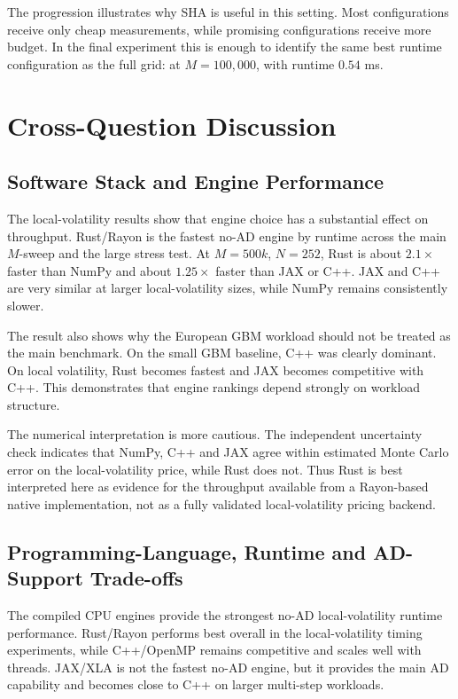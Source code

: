 The progression illustrates why SHA is useful in this setting. Most
configurations receive only cheap measurements, while promising configurations
receive more budget. In the final experiment this is enough to identify the
same best runtime configuration as the full grid:
 at \(M=100{,}000\), with runtime \(0.54\) ms.

\section{Cross-Question Discussion}
\label{sec:results-discussion}

\subsection{Software Stack and Engine Performance}
\label{subsec:discussion-software-stack}

The local-volatility results show that engine choice has a substantial effect
on throughput.  Rust/Rayon is the fastest no-AD engine by runtime across the main
\(M\)-sweep and the large stress test.  At \(M=500k\), \(N=252\), Rust is
about \(2.1\times\) faster than NumPy and about \(1.25\times\) faster than
JAX or C++.  JAX and C++ are very similar at larger local-volatility sizes,
while NumPy remains consistently slower.

The result also shows why the European GBM workload should not be treated as
the main benchmark.  On the small GBM baseline, C++ was clearly dominant.
On local volatility, Rust becomes fastest and JAX becomes competitive with
C++.  This demonstrates that engine rankings depend strongly on workload
structure.

The numerical interpretation is more cautious. The independent uncertainty
check indicates that NumPy, C++ and JAX agree within estimated Monte Carlo
error on the local-volatility price, while Rust does not. Thus Rust is best
interpreted here as evidence for the throughput available from a Rayon-based
native implementation, not as a fully validated local-volatility pricing
backend.

\subsection{Programming-Language, Runtime and AD-Support Trade-offs}
\label{subsec:discussion-language-ad}

The compiled CPU engines provide the strongest no-AD local-volatility
runtime performance.  Rust/Rayon performs best overall in the local-volatility
timing experiments, while C++/OpenMP remains competitive and scales well with
threads.  JAX/XLA is not the fastest no-AD engine, but it provides the main
AD capability and becomes close to C++ on larger multi-step workloads.

